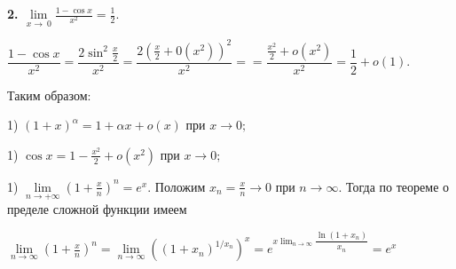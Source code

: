 \bf{2.} \rm $\lim\limits_{x\to\ 0} \frac{1-\cos x}{x^2} = \frac{1}{2}.$

\begin{center}
$ \dfrac{1-\cos x}{x^2}  =  \dfrac{2\sin^2 \frac{x}{2}}{x^2} = \dfrac{2(\frac{x}{2}+0(x^2))^2}{x^2}= = \dfrac{\frac{x^2}{2}+o(x^2)}{x^2} = \dfrac{1}{2}+o(1). $
\end{center}
Таким образом:

1) $(1+x)^\alpha=1+\alpha x + o(x)$ при $x \rightarrow  0;$

1) $\cos x=1- \frac{x^2}{2} + o(x^2)$ при $x \rightarrow  0;$

1) $\lim\limits_{n\to+\infty} \left(1+\frac{x}{n}\right)^{n} = e^{x}.$ Положим $x_n=\frac{x}{n} \rightarrow 0$ при $n \rightarrow  \infty.$ Тогда по теореме о пределе сложной функции имеем
\begin{center}
$ \lim\limits_{n\to\infty} \left(1+\frac{x}{n}\right)^{n} = \lim\limits_{n\to\infty} \left((1+x_n)^{1/x_n}\right)^{x} = e^{x\lim_{n\to\infty} \dfrac{\ln(1+x_n)}{x_n}}= e^{x}  $
\end{center}

